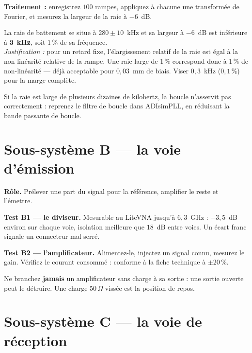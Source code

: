 \textbf{Traitement :} enregistrez $100$ rampes, appliquez à chacune une
transformée de Fourier, et mesurez la largeur de la raie à $-6$~dB.

\begin{critere}
La raie de battement se situe à $280 \pm 10$~kHz et sa largeur à $-6$~dB est
inférieure à $\mathbf{3}$~\textbf{kHz}, soit $1\,\%$ de sa fréquence.\\[1mm]
\emph{Justification :} pour un retard fixe, l'élargissement relatif de la raie
est égal à la non-linéarité relative de la rampe. Une raie large de $1\,\%$
correspond donc à $1\,\%$ de non-linéarité --- déjà acceptable pour
$0{,}03$~mm de biais. Viser $0{,}3$~kHz ($0{,}1\,\%$) pour la marge complète.
\end{critere}

Si la raie est large de plusieurs dizaines de kilohertz, la boucle n'asservit
pas correctement : reprenez le filtre de boucle dans ADIsimPLL, en réduisant la
bande passante de boucle.

\section{Sous-système B --- la voie d'émission}

\textbf{Rôle.} Prélever une part du signal pour la référence, amplifier le
reste et l'émettre.

\textbf{Test B1 --- le diviseur.} Mesurable au LiteVNA jusqu'à $6{,}3$~GHz :
$-3{,}5$~dB environ sur chaque voie, isolation meilleure que $18$~dB entre
voies. Un écart franc signale un connecteur mal serré.

\textbf{Test B2 --- l'amplificateur.} Alimentez-le, injectez un signal connu,
mesurez le gain. Vérifiez le courant consommé : conforme à la fiche technique à
$\pm 20\,\%$.

\begin{attention}
Ne branchez \textbf{jamais} un amplificateur sans charge à sa sortie : une
sortie ouverte peut le détruire. Une charge $50\,\Omega$ vissée est la position
de repos.
\end{attention}

\section{Sous-système C --- la voie de réception}

